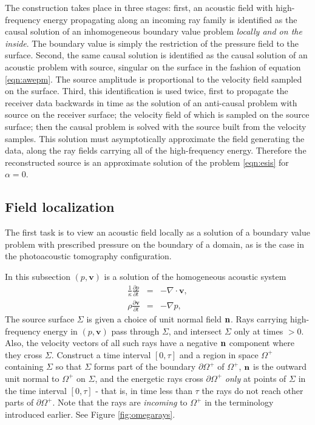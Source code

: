 \documentclass[georeport,12pt]{geophysics}
\newcommand{\bv}{\mathbf{v}}
\begin{document}
The construction takes place in three stages: first, an acoustic field
with high-frequency energy propagating along an incoming ray family is
identified as the causal solution of an inhomogeneous boundary value
problem {\em locally and on the inside}. The boundary value is simply
the restriction of the pressure field to the surface. Second, the same
causal solution is identified as the causal solution of an acoustic
problem with source, singular on the surface in the fashion of
equation \ref{eqn:awepm}. The source amplitude is proportional to the
velocity field sampled on the surface. Third, this identification is
used twice, first to propagate the receiver data backwards in time as
the solution of an anti-causal problem with source on the receiver
surface; the velocity field of which is sampled on the source surface;
then the causal problem is solved with the source built from the
velocity samples. This solution must asymptotically approximate the
field generating the data, along the ray fields carrying all of the
high-frequency energy. Therefore the reconstructed source is an
approximate solution of the problem \ref{eqn:esis} for $\alpha=0$.


\subsection{Field localization}
The first task is to view an acoustic field locally as a solution of a
boundary value problem with prescribed pressure on the boundary of a
domain, as is the case in the photoacoustic tomography configuration.

In this subsection $(p,\bv)$ is a solution of the homogeneous acoustic system
\begin{eqnarray}
\label{eqn:awefree}
  \frac{1}{\kappa}\frac{\partial p}{\partial t} & = & - \nabla \cdot \bv, \nonumber \\
  \rho\frac{\partial \bv}{\partial t} & = & - \nabla p,
\end{eqnarray}
The source surface $\Sigma$ is given a choice of unit normal field ${\bf
  n}$. Rays carrying
high-frequency energy in $(p,\bv)$ pass through $\Sigma$, and
intersect $\Sigma$ only at times
$>0$. Also, the velocity
vectors of all such rays have a negative ${\bf n}$ component where
they cross $\Sigma$. Construct a time interval $[0,\tau]$ and
a region in space $\Omega^+$ containing $\Sigma$ so that $\Sigma$ forms
part of the boundary $\partial \Omega^+$ of $\Omega^+$, ${\bf n}$ is the
outward unit normal to $\Omega^+$ on $\Sigma$, and the energetic
rays cross $\partial \Omega^+$ {\em only} at
points of $\Sigma$ in the time interval $[0,\tau]$ - that is, in time
less than $\tau$ the rays do not reach other parts of $\partial
\Omega^+$. Note that the rays are {\em incoming} to $\Omega^+$ in the terminology
introduced earlier. See Figure \ref{fig:omegarays}.
\end{document}
